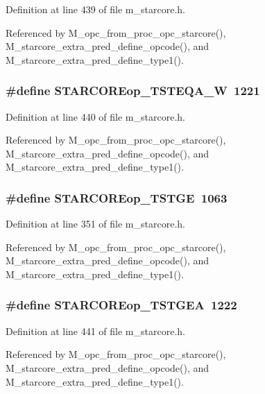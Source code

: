 Definition at line 439 of file m\_\-starcore.h.

Referenced by M\_\-opc\_\-from\_\-proc\_\-opc\_\-starcore(), M\_\-starcore\_\-extra\_\-pred\_\-define\_\-opcode(), and M\_\-starcore\_\-extra\_\-pred\_\-define\_\-type1().
\subsubsection{\setlength{\rightskip}{0pt plus 5cm}\#define STARCOREop\_\-TSTEQA\_\-W~1221}\label{m__starcore_8h_5a3188e0aba35e7f49a47e5f1d7bd519}




Definition at line 440 of file m\_\-starcore.h.

Referenced by M\_\-opc\_\-from\_\-proc\_\-opc\_\-starcore(), M\_\-starcore\_\-extra\_\-pred\_\-define\_\-opcode(), and M\_\-starcore\_\-extra\_\-pred\_\-define\_\-type1().
\subsubsection{\setlength{\rightskip}{0pt plus 5cm}\#define STARCOREop\_\-TSTGE~1063}\label{m__starcore_8h_6185034de2cf466ff6355399067992da}




Definition at line 351 of file m\_\-starcore.h.

Referenced by M\_\-opc\_\-from\_\-proc\_\-opc\_\-starcore(), M\_\-starcore\_\-extra\_\-pred\_\-define\_\-opcode(), and M\_\-starcore\_\-extra\_\-pred\_\-define\_\-type1().
\subsubsection{\setlength{\rightskip}{0pt plus 5cm}\#define STARCOREop\_\-TSTGEA~1222}\label{m__starcore_8h_f3b7eef280acfd66adfef315d68ae50c}




Definition at line 441 of file m\_\-starcore.h.

Referenced by M\_\-opc\_\-from\_\-proc\_\-opc\_\-starcore(), M\_\-starcore\_\-extra\_\-pred\_\-define\_\-opcode(), and M\_\-starcore\_\-extra\_\-pred\_\-define\_\-type1().
